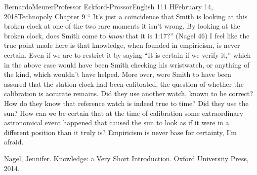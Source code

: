 \documentclass[12pt,letterpaper]{article}
\begin{document}
\begin{mla}{Bernardo}{Meurer}{Professor Eckford-Prossor}{English 111 H}{February 14, 2018}{Technopoly Chapter 9}
    `` It's just a coincidence that Smith is looking at this broken clock at one of the two rare moments it isn't wrong. By looking at the broken clock, does Smith come to \emph{know} that it is 1:17?'' (Nagel 46)
    \vspace{10pt}
    I feel like the true point made here is that knowledge, when founded in empiricism, is never certain. Even if we are to restrict it by saying ``It is certain if we verify it,'' which in the above case would have been Smith checking his wristwatch, or anything of the kind, which wouldn't have helped. More over, were Smith to have been assured that the station clock had been calibrated, the question of whether the calibration is accurate remains. Did they use another watch, known to be correct? How do they know that reference watch is indeed true to time? Did they use the sun? How can we be certain that at the time of calibration some extraordinary astronomical event happened that caused the sun to look as if it were in a different position than it truly is? Empiricism is never base for certainty, I'm afraid.
    \begin{workscited}
        \bibent Nagel, Jennifer. Knowledge: a Very Short Introduction. Oxford University Press, 2014.
    \end{workscited}
\end{mla}
\end{document}
